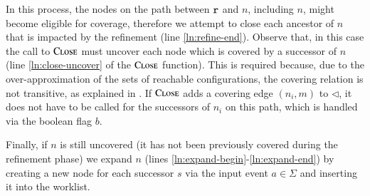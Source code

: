 \documentclass[10pt]{llncs}
\begin{document}
In this process, the nodes on the path between $\mathtt{r}$ and $n$,
including $n$, might become eligible for coverage, therefore we
attempt to close each ancestor of $n$ that is impacted by the
refinement (line \ref{ln:refine-end}). Observe that, in this case the
call to $\Call{Close}{}$ must uncover each node which is covered by a
successor of $n$ (line \ref{ln:close-uncover} of the $\Call{Close}{}$
function). This is required because, due to the over-approximation of
the sets of reachable configurations, the covering relation is not
transitive, as explained in \cite{mcmillan06}. If $\Call{Close}{}$
adds a covering edge $(n_i,m)$ to $\lhd$, it does not have to be
called for the successors of $n_i$ on this path, which is handled via
the boolean flag $b$.

Finally, if $n$ is still uncovered (it has not been previously covered
during the refinement phase) we expand $n$ (lines
\ref{ln:expand-begin}-\ref{ln:expand-end}) by creating a new node for
each successor $s$ via the input event $a \in \Sigma$ and inserting it
into the worklist.
\end{document}
